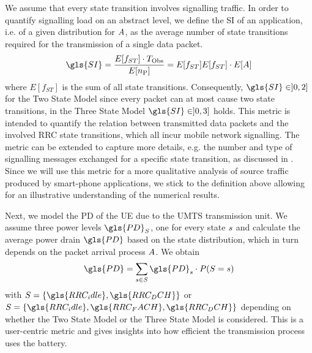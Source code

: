 \newcommand{\fStateTransitions}{E[f_{ST}]\xspace}

We assume that every state transition involves signalling traffic.
In order to quantify signalling load on an abstract level, we define the \gls{SI} of an application, i.e. of a given distribution for \(A\), as the average number of state transitions required for the transmission of a single data packet.
\begin{equation}
\gls{SI} = \frac{\fStateTransitions \cdot \ObservationInterval}{E[\NObservedPackets]}\\
= \fStateTransitions {E[f_{ST}] }\cdot E[\PacketIAT]
\label{eq::sigIntensity}
\end{equation}
where \(\fStateTransitions\) is the sum of all state transitions.
Consequently, \(\gls{SI} \in ]0,2]\) for the Two State Model since every packet can at most cause two state transitions, in the Three State Model \(\gls{SI} \in]0,3]\) holds.
This metric is intended to quantify the relation between transmitted data packets and the involved \gls{RRC} state transitions, which all incur mobile network signalling.
The metric can be extended to capture more details, e.g. the number and type of signalling messages exchanged for a specific state transition, as discussed in .
Since we will use this metric for a more qualitative analysis of source traffic produced by smart-phone applications, we stick to the definition above allowing for an illustrative understanding of the numerical results.

Next, we model the \gls{PD} of the \gls{UE} due to the \gls{UMTS} transmission unit.
We assume three power levels \(\gls{PD}_{\RRCState}\), one for every state \(s\) and calculate the average power drain \(\gls{PD}\) based on the state distribution, which in turn depends on the packet arrival process \(A\).
We obtain
\begin{equation}
\gls{PD} = \sum_{\RRCStateRealization\in\RRCState} \gls{PD}_{\RRCStateRealization} \cdot P(\RRCState=\RRCStateRealization)
\label{eq::powerdrain}
\end{equation}
with \(\RRCState = \{\gls{RRC_idle},\gls{RRC_DCH}\}\) or \(\RRCState = \{\gls{RRC_idle},\gls{RRC_FACH},\gls{RRC_DCH}\}\) depending on whether the Two State Model or the Three State Model is considered.
This is a user-centric metric and gives insights into how efficient the transmission process uses the battery.
